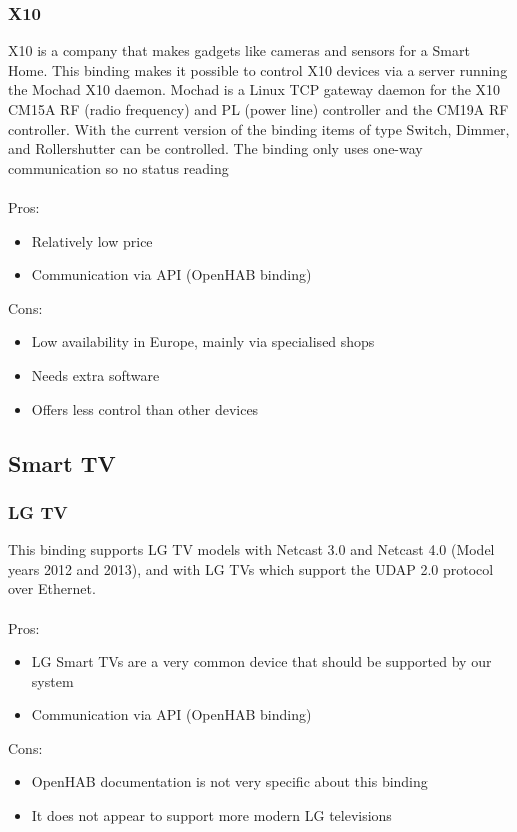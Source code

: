 \subsubsection{X10}
X10 is a company that makes gadgets like cameras and sensors for a Smart Home. This binding makes it possible to control X10 
devices via a server running the Mochad X10 daemon. Mochad is a Linux TCP gateway daemon for the X10 CM15A RF (radio frequency)
and PL (power line) controller and the CM19A RF controller. With the current version of the binding items of type Switch, Dimmer, and 
Rollershutter can be controlled. The binding only uses one-way communication so no status reading\\~\\
Pros:
\begin{itemize}
	\item Relatively low price
	\item Communication via API (OpenHAB binding)
\end{itemize}
Cons:
\begin{itemize}
	\item Low availability in Europe, mainly via specialised shops
	\item Needs extra software
	\item Offers less control than other devices
\end{itemize}

\subsection{Smart TV}

\subsubsection{LG TV}
This binding supports LG TV models with Netcast 3.0 and Netcast 4.0 (Model years 2012 and 2013), and with LG TVs which support the
UDAP 2.0 protocol over Ethernet.\\~\\
Pros:
\begin{itemize}
	\item LG Smart TVs are a very common device that should be supported by our system
	\item Communication via API (OpenHAB binding)
\end{itemize}
Cons:
\begin{itemize}
	\item OpenHAB documentation is not very specific about this binding
	\item It does not appear to support more modern LG televisions
\end{itemize}

